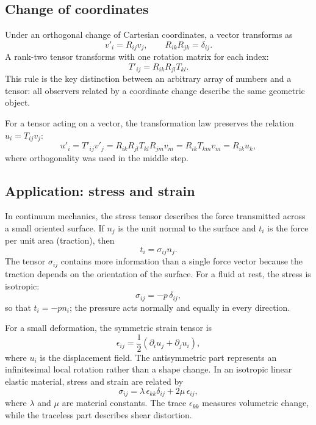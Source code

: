 \subsection{Change of coordinates}
Under an orthogonal change of Cartesian coordinates, a vector transforms as
\begin{equation}
v'_i=R_{ij}v_j,
\qquad
R_{ik}R_{jk}=\delta_{ij}.
\end{equation}
A rank-two tensor transforms with one rotation matrix for each index:
\begin{equation}
T'_{ij}=R_{ik}R_{jl}T_{kl}.
\end{equation}
This rule is the key distinction between an arbitrary array of numbers and a tensor: all observers related by a coordinate change describe the same geometric object.

For a tensor acting on a vector, the transformation law preserves the relation $u_i=T_{ij}v_j$:
\begin{equation}
u'_i=T'_{ij}v'_j
=R_{ik}R_{jl}T_{kl}R_{jm}v_m
=R_{ik}T_{km}v_m
=R_{ik}u_k,
\end{equation}
where orthogonality was used in the middle step.

\subsection{Application: stress and strain}
In continuum mechanics, the stress tensor describes the force transmitted across a small oriented surface. If $n_j$ is the unit normal to the surface and $t_i$ is the force per unit area (traction), then
\begin{equation}
t_i=\sigma_{ij}n_j.
\end{equation}
The tensor $\sigma_{ij}$ contains more information than a single force vector because the traction depends on the orientation of the surface. For a fluid at rest, the stress is isotropic:
\begin{equation}
\sigma_{ij}=-p\,\delta_{ij},
\end{equation}
so that $t_i=-pn_i$; the pressure acts normally and equally in every direction.

For a small deformation, the symmetric strain tensor is
\begin{equation}
\epsilon_{ij}=\frac12\left(\partial_i u_j+\partial_j u_i\right),
\end{equation}
where $u_i$ is the displacement field. The antisymmetric part represents an infinitesimal local rotation rather than a shape change. In an isotropic linear elastic material, stress and strain are related by
\begin{equation}
\sigma_{ij}=\lambda\,\epsilon_{kk}\delta_{ij}+2\mu\,\epsilon_{ij},
\end{equation}
where $\lambda$ and $\mu$ are material constants. The trace $\epsilon_{kk}$ measures volumetric change, while the traceless part describes shear distortion.

